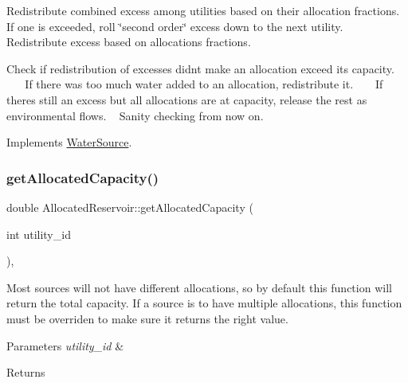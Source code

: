 Redistribute combined excess among utilities based on their allocation fractions. If one is exceeded, roll \char`\"{}second order\char`\"{} excess down to the next utility. ~\newline
~\newline
~\newline
~\newline
~\newline
 Redistribute excess based on allocations fractions.

Check if redistribution of excesses didn\textquotesingle{}t make an allocation exceed its capacity. ~\newline
~\newline
~\newline
 If there was too much water added to an allocation, redistribute it. ~\newline
~\newline
 If there\textquotesingle{}s still an excess but all allocations are at capacity, release the rest as environmental flows. ~\newline
 Sanity checking from now on. 

Implements \mbox{\hyperlink{classWaterSource_ac070445379fe706f65b977dade4f3fbc}{Water\+Source}}.

\mbox{\label{classAllocatedReservoir_a8b9b38494fa23f0bea78134c82644bf1}} 
\subsubsection{\texorpdfstring{get\+Allocated\+Capacity()}{getAllocatedCapacity()}}
{\footnotesize\ttfamily double Allocated\+Reservoir\+::get\+Allocated\+Capacity (\begin{DoxyParamCaption}\item[{int}]{utility\+\_\+id }\end{DoxyParamCaption})\hspace{0.3cm}{\ttfamily [override]}, {\ttfamily [virtual]}}

Most sources will not have different allocations, so by default this function will return the total capacity. If a source is to have multiple allocations, this function must be overriden to make sure it returns the right value. 
\begin{DoxyParams}{Parameters}
{\em utility\+\_\+id} & \\
\hline
\end{DoxyParams}
\begin{DoxyReturn}{Returns}

\end{DoxyReturn}


